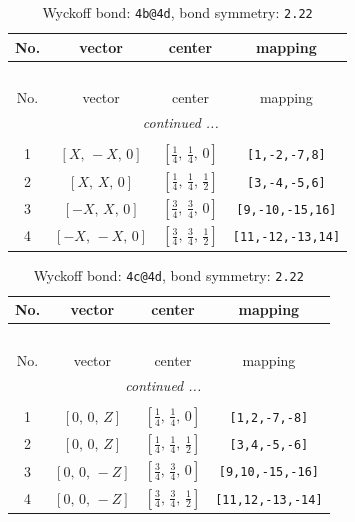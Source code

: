 \documentclass[fleqn,8pt]{jsarticle}
\begin{document}
\begin{longtable}{cccc}
\caption{Wyckoff bond: {\tt 4b@4d}, bond symmetry: {\tt 2.22}}
 \\
 \hline \hline
No. & vector & center & mapping \\ \hline \endfirsthead

\multicolumn{3}{l}{\tablename\ \thetable{}} \\
 \hline \hline
No. & vector & center & mapping \\ \hline \endhead

 \hline \hline
\multicolumn{3}{r}{\footnotesize\it continued ...} \\ \endfoot

 \hline \hline
\multicolumn{3}{r}{} \\ \endlastfoot

1 & $\left[ X,\, - X,\, 0 \right]$ & $\left[ \frac{1}{4},\, \frac{1}{4},\, 0 \right]$ & {\tt [1,-2,-7,8]} \\ \hline
2 & $\left[ X,\, X,\, 0 \right]$ & $\left[ \frac{1}{4},\, \frac{1}{4},\, \frac{1}{2} \right]$ & {\tt [3,-4,-5,6]} \\ \hline
3 & $\left[ - X,\, X,\, 0 \right]$ & $\left[ \frac{3}{4},\, \frac{3}{4},\, 0 \right]$ & {\tt [9,-10,-15,16]} \\ \hline
4 & $\left[ - X,\, - X,\, 0 \right]$ & $\left[ \frac{3}{4},\, \frac{3}{4},\, \frac{1}{2} \right]$ & {\tt [11,-12,-13,14]} \\
\end{longtable}
\renewcommand{\arraystretch}{1.2}
\begin{longtable}{cccc}
\caption{Wyckoff bond: {\tt 4c@4d}, bond symmetry: {\tt 2.22}}
 \\
 \hline \hline
No. & vector & center & mapping \\ \hline \endfirsthead

\multicolumn{3}{l}{\tablename\ \thetable{}} \\
 \hline \hline
No. & vector & center & mapping \\ \hline \endhead

 \hline \hline
\multicolumn{3}{r}{\footnotesize\it continued ...} \\ \endfoot

 \hline \hline
\multicolumn{3}{r}{} \\ \endlastfoot

1 & $\left[ 0,\, 0,\, Z \right]$ & $\left[ \frac{1}{4},\, \frac{1}{4},\, 0 \right]$ & {\tt [1,2,-7,-8]} \\ \hline
2 & $\left[ 0,\, 0,\, Z \right]$ & $\left[ \frac{1}{4},\, \frac{1}{4},\, \frac{1}{2} \right]$ & {\tt [3,4,-5,-6]} \\ \hline
3 & $\left[ 0,\, 0,\, - Z \right]$ & $\left[ \frac{3}{4},\, \frac{3}{4},\, 0 \right]$ & {\tt [9,10,-15,-16]} \\ \hline
4 & $\left[ 0,\, 0,\, - Z \right]$ & $\left[ \frac{3}{4},\, \frac{3}{4},\, \frac{1}{2} \right]$ & {\tt [11,12,-13,-14]} \\
\end{longtable}
\end{document}
